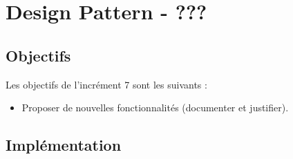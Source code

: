 \newpage
\section{Design Pattern - ???}

\subsection{Objectifs}

Les objectifs de l'incrément 7 sont les suivants :\\
\begin{itemize}
\item Proposer de nouvelles fonctionnalités (documenter et justifier).\\
\end{itemize}

\subsection{Implémentation}